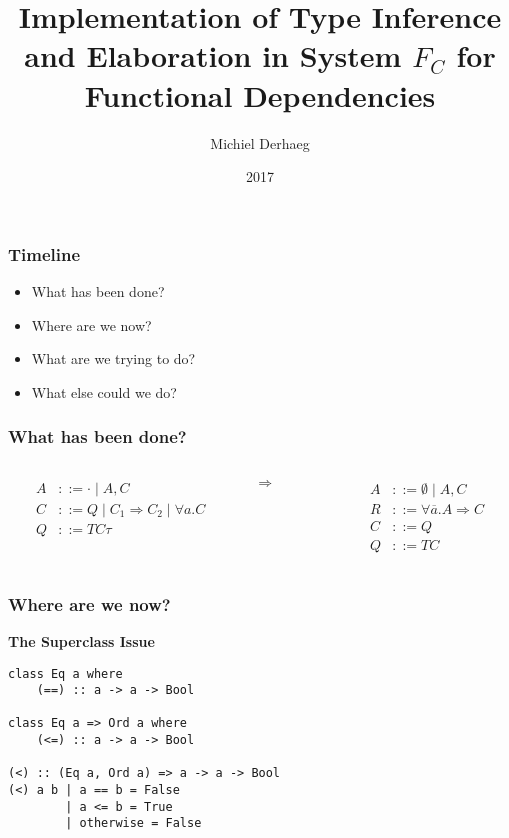 \documentclass{beamer}
\title{Implementation of Type Inference and Elaboration in System $F_C$ for
Functional Dependencies}
\author{Michiel Derhaeg}
\institute{KULeuven}
\date{2017}
\begin{document}
\frame{\titlepage}

\begin{frame}
    \frametitle{Timeline}
    \begin{itemize}
        \item What has been done?
        \item Where are we now?
        \item What are we trying to do?
        \item What else could we do?
    \end{itemize}
\end{frame}

\begin{frame}
    \frametitle{What has been done?}
    \begin{columns}
        \begin{column}{0.4\textwidth}
            \begin{align*}
                A &::= \cdot \mid A, C \\
                C &::= Q \mid C_1 \Rightarrow C_2 \mid \forall a. C \\
                Q &::= TC \tau
            \end{align*}
        \end{column}
        \begin{column}{0.1\textwidth}
            $\Longrightarrow$
        \end{column}
        \begin{column}{0.4\textwidth}
            \begin{align*}
                A &::= \emptyset \mid A, C \\
                R &::= \forall \overline{a}. A \Rightarrow C \\
                C &::= Q \\
                Q &::= TC
            \end{align*}
        \end{column}
    \end{columns}
    \pause
    
\end{frame}

\begin{frame}[fragile]
    \frametitle{Where are we now?}
    \textbf{The Superclass Issue}
    \begin{lstlisting}
class Eq a where
    (==) :: a -> a -> Bool

class Eq a => Ord a where
    (<=) :: a -> a -> Bool

(<) :: (Eq a, Ord a) => a -> a -> Bool
(<) a b | a == b = False
        | a <= b = True
        | otherwise = False
    \end{lstlisting}
\end{frame}
\end{document}
